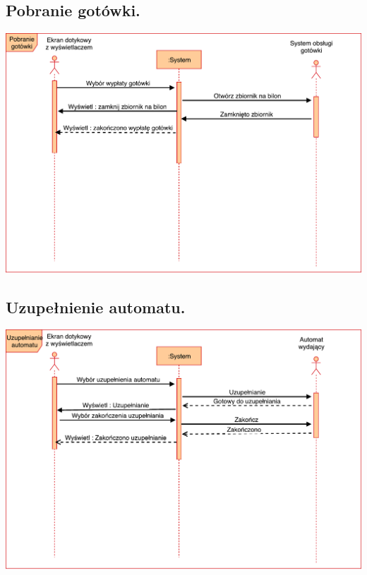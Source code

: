 \documentclass[11pt]{article}
\begin{document}
		\subsection{Pobranie gotówki.}
		\begin{center}
			\includegraphics[scale=0.65]{PobranieGotowki.pdf}
		\end{center}
		\newpage
		\subsection{Uzupełnienie automatu.}
		\begin{center}
			\includegraphics[scale=0.65]{UzupelnianieAutomatu.pdf}
		\end{center}
\end{document}
